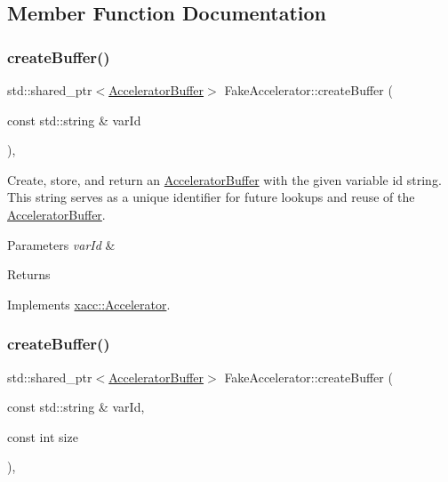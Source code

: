 \subsection{Member Function Documentation}
\mbox{\label{a02496_ae39580fdc83ce9f4df0967382398950e}} 
\subsubsection{\texorpdfstring{create\+Buffer()}{createBuffer()}\hspace{0.1cm}{\footnotesize\ttfamily [1/2]}}
{\footnotesize\ttfamily std\+::shared\+\_\+ptr$<$\hyperlink{a02444}{Accelerator\+Buffer}$>$ Fake\+Accelerator\+::create\+Buffer (\begin{DoxyParamCaption}\item[{const std\+::string \&}]{var\+Id }\end{DoxyParamCaption})\hspace{0.3cm}{\ttfamily [inline]}, {\ttfamily [virtual]}}

Create, store, and return an \hyperlink{a02444}{Accelerator\+Buffer} with the given variable id string. This string serves as a unique identifier for future lookups and reuse of the \hyperlink{a02444}{Accelerator\+Buffer}.


\begin{DoxyParams}{Parameters}
{\em var\+Id} & \\
\hline
\end{DoxyParams}
\begin{DoxyReturn}{Returns}

\end{DoxyReturn}


Implements \hyperlink{a02432_aab5046e8d83ab390302e0f49533e95fc}{xacc\+::\+Accelerator}.

\mbox{\label{a02496_a09f29b893338dfb0a56dd183cf6949fe}} 
\subsubsection{\texorpdfstring{create\+Buffer()}{createBuffer()}\hspace{0.1cm}{\footnotesize\ttfamily [2/2]}}
{\footnotesize\ttfamily std\+::shared\+\_\+ptr$<$\hyperlink{a02444}{Accelerator\+Buffer}$>$ Fake\+Accelerator\+::create\+Buffer (\begin{DoxyParamCaption}\item[{const std\+::string \&}]{var\+Id,  }\item[{const int}]{size }\end{DoxyParamCaption})\hspace{0.3cm}{\ttfamily [inline]}, {\ttfamily [virtual]}}

